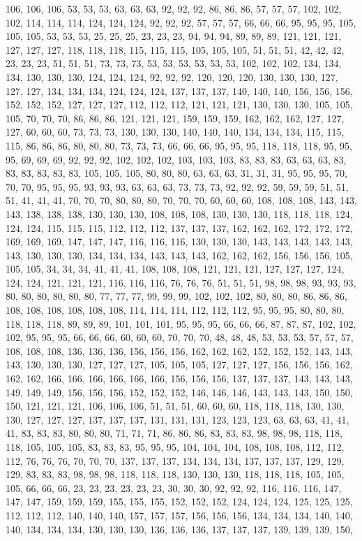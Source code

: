 106, 106, 106, 53, 53, 53, 63, 63, 63, 92, 92, 92, 86, 86, 86, 57, 57, 57, 102, 102, 102, 114, 114, 114, 124, 124, 124, 92, 92, 92, 57, 57, 57, 66, 66, 66, 95, 95, 95, 105, 105, 105, 53, 53, 53, 25, 25, 25, 23, 23, 23, 94, 94, 94, 89, 89, 89, 121, 121, 121, 127, 127, 127, 118, 118, 118, 115, 115, 115, 105, 105, 105, 51, 51, 51, 42, 42, 42, 23, 23, 23, 51, 51, 51, 73, 73, 73, 53, 53, 53, 53, 53, 53, 102, 102, 102, 134, 134, 134, 130, 130, 130, 124, 124, 124, 92, 92, 92, 120, 120, 120, 130, 130, 130, 127, 127, 127, 134, 134, 134, 124, 124, 124, 137, 137, 137, 140, 140, 140, 156, 156, 156, 152, 152, 152, 127, 127, 127, 112, 112, 112, 121, 121, 121, 130, 130, 130, 105, 105, 105, 70, 70, 70, 86, 86, 86, 121, 121, 121, 159, 159, 159, 162, 162, 162, 127, 127, 127, 60, 60, 60, 73, 73, 73, 130, 130, 130, 140, 140, 140, 134, 134, 134, 115, 115, 115, 86, 86, 86, 80, 80, 80, 73, 73, 73, 66, 66, 66, 95, 95, 95, 118, 118, 118, 95, 95, 95, 69, 69, 69, 92, 92, 92, 102, 102, 102, 103, 103, 103, 83, 83, 83, 63, 63, 63, 83, 83, 83, 83, 83, 83, 105, 105, 105, 80, 80, 80, 63, 63, 63, 31, 31, 31, 95, 95, 95, 70, 70, 70, 95, 95, 95, 93, 93, 93, 63, 63, 63, 73, 73, 73, 92, 92, 92, 59, 59, 59, 51, 51, 51, 41, 41, 41, 70, 70, 70, 80, 80, 80, 70, 70, 70, 60, 60, 60, 108, 108, 108, 143, 143, 143, 138, 138, 138, 130, 130, 130, 108, 108, 108, 130, 130, 130, 118, 118, 118, 124, 124, 124, 115, 115, 115, 112, 112, 112, 137, 137, 137, 162, 162, 162, 172, 172, 172, 169, 169, 169, 147, 147, 147, 116, 116, 116, 130, 130, 130, 143, 143, 143, 143, 143, 143, 130, 130, 130, 134, 134, 134, 143, 143, 143, 162, 162, 162, 156, 156, 156, 105, 105, 105, 34, 34, 34, 41, 41, 41, 108, 108, 108, 121, 121, 121, 127, 127, 127, 124, 124, 124, 121, 121, 121, 116, 116, 116, 76, 76, 76, 51, 51, 51, 98, 98, 98, 93, 93, 93, 80, 80, 80, 80, 80, 80, 77, 77, 77, 99, 99, 99, 102, 102, 102, 80, 80, 80, 86, 86, 86, 108, 108, 108, 108, 108, 108, 114, 114, 114, 112, 112, 112, 95, 95, 95, 80, 80, 80, 118, 118, 118, 89, 89, 89, 101, 101, 101, 95, 95, 95, 66, 66, 66, 87, 87, 87, 102, 102, 102, 95, 95, 95, 66, 66, 66, 60, 60, 60, 70, 70, 70, 48, 48, 48, 53, 53, 53, 57, 57, 57, 108, 108, 108, 136, 136, 136, 156, 156, 156, 162, 162, 162, 152, 152, 152, 143, 143, 143, 130, 130, 130, 127, 127, 127, 105, 105, 105, 127, 127, 127, 156, 156, 156, 162, 162, 162, 166, 166, 166, 166, 166, 166, 156, 156, 156, 137, 137, 137, 143, 143, 143, 149, 149, 149, 156, 156, 156, 152, 152, 152, 146, 146, 146, 143, 143, 143, 150, 150, 150, 121, 121, 121, 106, 106, 106, 51, 51, 51, 60, 60, 60, 118, 118, 118, 130, 130, 130, 127, 127, 127, 137, 137, 137, 131, 131, 131, 123, 123, 123, 63, 63, 63, 41, 41, 41, 83, 83, 83, 80, 80, 80, 71, 71, 71, 86, 86, 86, 83, 83, 83, 98, 98, 98, 118, 118, 118, 105, 105, 105, 83, 83, 83, 95, 95, 95, 104, 104, 104, 108, 108, 108, 112, 112, 112, 76, 76, 76, 70, 70, 70, 137, 137, 137, 134, 134, 134, 137, 137, 137, 129, 129, 129, 83, 83, 83, 98, 98, 98, 118, 118, 118, 130, 130, 130, 118, 118, 118, 105, 105, 105, 66, 66, 66, 23, 23, 23, 23, 23, 23, 30, 30, 30, 92, 92, 92, 116, 116, 116, 147, 147, 147, 159, 159, 159, 155, 155, 155, 152, 152, 152, 124, 124, 124, 125, 125, 125, 112, 112, 112, 140, 140, 140, 157, 157, 157, 156, 156, 156, 134, 134, 134, 140, 140, 140, 134, 134, 134, 130, 130, 130, 136, 136, 136, 137, 137, 137, 139, 139, 139, 150, 
